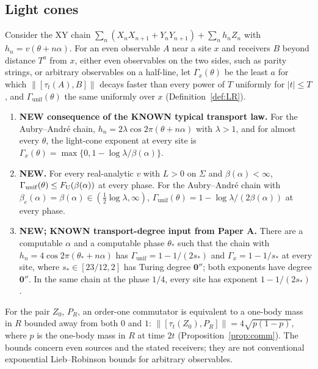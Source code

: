 \subsection{Light cones}

Consider the XY chain $\sum_n(X_nX_{n+1}+Y_nY_{n+1})+\sum_nh_nZ_n$ with $h_n=v(\theta+n\alpha)$. For an even observable $A$ near a site $x$ and receivers $B$ beyond distance $T^a$ from $x$, either even observables on the two sides, such as parity strings, or arbitrary observables on a half-line, let $\Gamma_x(\theta)$ be the least $a$ for which $\|[\tau_t(A),B]\|$ decays faster than every power of $T$ uniformly for $|t|\le T$, and $\Gamma_{\mathrm{unif}}(\theta)$ the same uniformly over $x$ (Definition~\ref{def:LR}).

\begin{maintheorem}\label{thm:D}
\begin{enumerate}
\item \textbf{NEW consequence of the KNOWN typical transport law.} For the Aubry--Andr\'e chain, $h_n=2\lambda\cos2\pi(\theta+n\alpha)$ with $\lambda>1$, and for almost every $\theta$, the light-cone exponent at every site is $\Gamma_x(\theta)=\max\{0,1-\log\lambda/\beta(\alpha)\}$.
\item \textbf{NEW.} For every real-analytic $v$ with $L>0$ on $\Sigma$ and $\beta(\alpha)<\infty$, $\Gamma_{\mathrm{unif}}(\theta)\le F_{\mathrm U}(\beta(\alpha))$ at every phase. For the Aubry--Andr\'e chain with $\beta_e(\alpha)=\beta(\alpha)\in(\tfrac12\log\lambda,\infty)$, $\Gamma_{\mathrm{unif}}(\theta)=1-\log\lambda/(2\beta(\alpha))$ at every phase.
\item \textbf{NEW; KNOWN transport-degree input from Paper A.} There are a computable $\alpha$ and a computable phase $\theta_*$ such that the chain with $h_n=4\cos2\pi(\theta_*+n\alpha)$ has $\Gamma_{\mathrm{unif}}=1-1/(2s_*)$ and $\Gamma_x=1-1/s_*$ at every site, where $s_*\in[23/12,2]$ has Turing degree $\mathbf 0''$; both exponents have degree $\mathbf 0''$. In the same chain at the phase $1/4$, every site has exponent $1-1/(2s_*)$.
\end{enumerate}
\end{maintheorem}

For the pair $Z_0$, $P_R$, an order-one commutator is equivalent to a one-body mass in $R$ bounded away from both $0$ and $1$: $\|[\tau_t(Z_0),P_R]\|=4\sqrt{p(1-p)}$, where $p$ is the one-body mass in $R$ at time $2t$ (Proposition~\ref{prop:comm}). The bounds concern even sources and the stated receivers; they are not conventional exponential Lieb--Robinson bounds for arbitrary observables.

